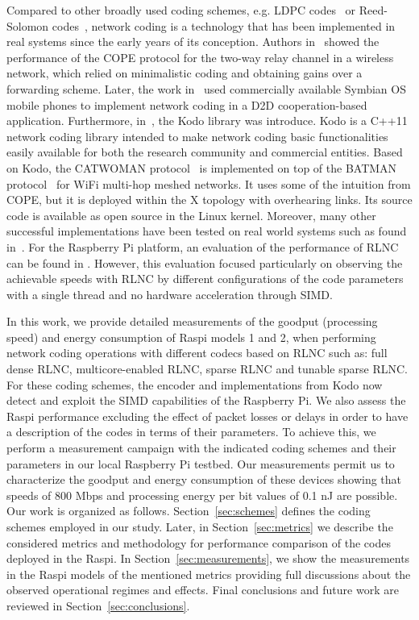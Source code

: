 Compared to other broadly used coding schemes, e.g. \ac{LDPC}
codes~\cite{gallager1962low} or Reed-Solomon
codes~\cite{reed1960polynomial}, network coding is a technology that
has been implemented in real systems since the early years of its
conception. Authors in~\cite{katti2008xors} showed the
performance of the COPE protocol for the two-way relay channel
in a wireless network, which relied on minimalistic coding and obtaining
gains over a forwarding scheme. Later, the work in~\cite{pedersen2008implementation} used commercially available
Symbian OS mobile phones to implement network coding in a
\ac{D2D} cooperation-based application. Furthermore,
in~\cite{kodo2011pedersen}, the Kodo library was introduce. Kodo is
a C++11 network coding library intended to make network coding
basic functionalities easily available for both the research community
and commercial entities. Based on Kodo, the CATWOMAN
protocol~\cite{hundeboll2012catwoman} is implemented on top of the
BATMAN protocol~\cite{johnson2008simple} for WiFi multi-hop meshed
networks. It uses some of the intuition from COPE, but it is deployed
within the X topology with overhearing links. Its source code is available
as open source in the Linux kernel. Moreover, many other successful
implementations have been tested on real world systems such as
found in~\cite{pahlevani2013playncool,krigslund2013core,
paramanathan2013leanandmean}. For the Raspberry Pi platform, an evaluation
of the performance of \ac{RLNC} can be found in \cite{paramanathan2014sharing}.
However, this evaluation focused particularly on observing the achievable
speeds with \ac{RLNC} \cite{ho2006random} by different configurations of
the code parameters with a single thread and no hardware acceleration through
\ac{SIMD}.

In this work, we provide detailed measurements of the goodput (processing
speed) and energy consumption of \ac{Raspi} models 1 and 2, when
performing network coding operations with different codecs based on \ac{RLNC}
such as: full dense \ac{RLNC}, multicore-enabled \ac{RLNC}, sparse \ac{RLNC}
and tunable sparse \ac{RLNC}. For these coding schemes, the encoder and implementations from Kodo now detect and exploit the \ac{SIMD}
capabilities of the Raspberry Pi. We also assess the \ac{Raspi}
performance excluding the effect of packet losses or delays in order to have a
description of the codes in terms of their parameters. To achieve this,
we perform a measurement campaign with the indicated coding schemes and
their parameters in our local Raspberry Pi testbed. Our measurements permit
us to characterize the goodput and energy consumption
of these devices showing that speeds of 800 Mbps and processing energy per bit
values of 0.1 nJ are possible. Our work is organized as follows.
Section~\ref{sec:schemes} defines the
coding schemes employed in our study. Later, in Section~\ref{sec:metrics}
we describe the considered metrics and methodology for performance comparison
of the codes deployed in the \ac{Raspi}. In Section~\ref{sec:measurements}, we
show the measurements in the \ac{Raspi} models of the mentioned metrics
providing full discussions about the observed operational regimes and effects.
Final conclusions and future work are reviewed in
Section~\ref{sec:conclusions}.

